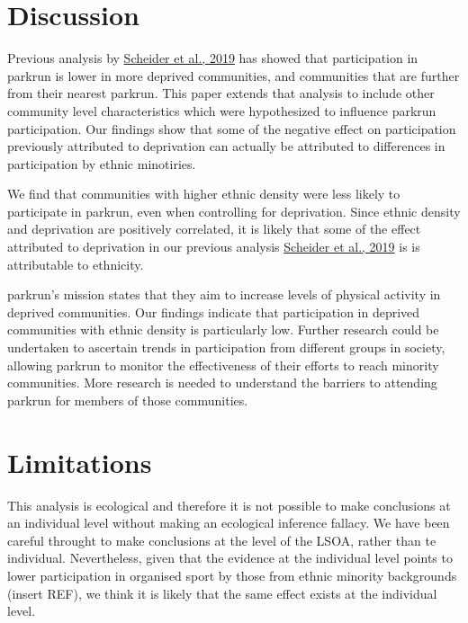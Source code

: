 \documentclass[]{article}
\begin{document}
\newpage

\hypertarget{discussion}{%
\section{Discussion}\label{discussion}}

Previous analysis by
\href{https://www.medrxiv.org/content/early/2019/08/29/19004143.full.pdf}{Scheider
et al., 2019} has showed that participation in parkrun is lower in more
deprived communities, and communities that are further from their
nearest parkrun. This paper extends that analysis to include other
community level characteristics which were hypothesized to influence
parkrun participation. Our findings show that some of the negative
effect on participation previously attributed to deprivation can
actually be attributed to differences in participation by ethnic
minotiries.

We find that communities with higher ethnic density were less likely to
participate in parkrun, even when controlling for deprivation. Since
ethnic density and deprivation are positively correlated, it is likely
that some of the effect attributed to deprivation in our previous
analysis
\href{https://www.medrxiv.org/content/early/2019/08/29/19004143.full.pdf}{Scheider
et al., 2019} is is attributable to ethnicity.

parkrun's mission states that they aim to increase levels of physical
activity in deprived communities. Our findings indicate that
participation in deprived communities with ethnic density is
particularly low. Further research could be undertaken to ascertain
trends in participation from different groups in society, allowing
parkrun to monitor the effectiveness of their efforts to reach minority
communities. More research is needed to understand the barriers to
attending parkrun for members of those communities.

\hypertarget{limitations}{%
\section{Limitations}\label{limitations}}

This analysis is ecological and therefore it is not possible to make
conclusions at an individual level without making an ecological
inference fallacy. We have been careful throught to make conclusions at
the level of the LSOA, rather than te individual. Nevertheless, given
that the evidence at the individual level points to lower participation
in organised sport by those from ethnic minority backgrounds (insert
REF), we think it is likely that the same effect exists at the
individual level.
\end{document}
